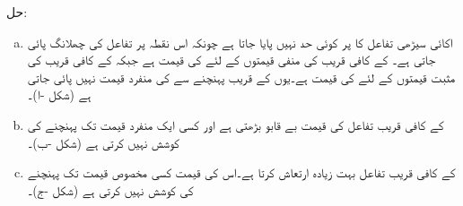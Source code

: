 حل:\quad
\begin{enumerate}[a.]
\item
اکائی سیڑھی تفاعل  کا  پر کوئی حد نہیں پایا جاتا ہے چونکہ اس نقطہ پر تفاعل کی چھلانگ پائی جاتی ہے۔ کے کافی قریب  کی منفی قیمتوں کے لئے  کی قیمت  ہے جبکہ  کے کافی  قریب    کی مثبت قیمتوں کے لئے  کی قیمت  ہے۔یوں  کے قریب پہنچنے سے  کی منفرد قیمت نہیں پائی جاتی ہے (شکل -ا)۔
\item
{} کے کافی قریب تفاعل کی قیمت بے قابو بڑھتی ہے اور کسی ایک منفرد قیمت تک پہنچنے کی کوشش نہیں کرتی ہے (شکل -ب)۔
\item
{} کے کافی قریب تفاعل بہت زیادہ ارتعاش کرتا ہے۔اس کی قیمت کسی مخصوص قیمت تک پہنچنے کی کوشش نہیں کرتی ہے (شکل -ج)۔ 
\end{enumerate}
%
